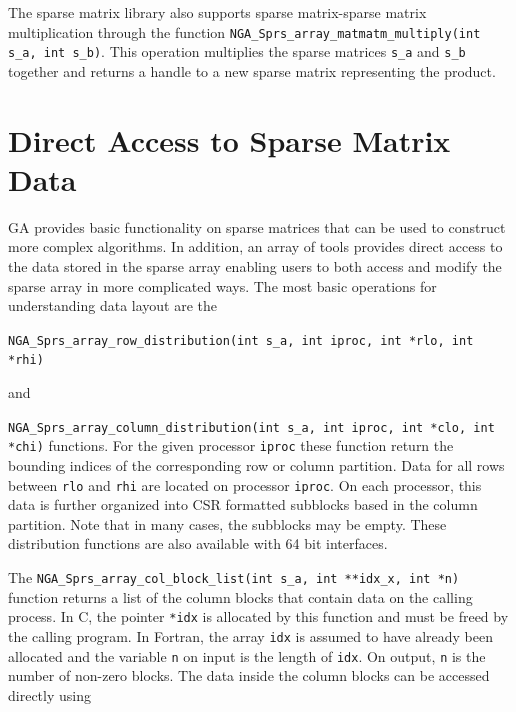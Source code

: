 The sparse matrix library also supports sparse matrix-sparse matrix
multiplication through the function \texttt{NGA\_Sprs\_array\_matmatm\_multiply(int
s\_a, int s\_b)}. This operation multiplies the sparse matrices \texttt{s\_a}
and \texttt{s\_b} together and returns a handle to a new sparse matrix
representing the product.

\section{Direct Access to Sparse Matrix Data}

GA provides basic functionality on sparse matrices that can be used to construct
more complex algorithms. In addition, an array of tools provides direct access
to the data stored in the sparse array enabling users to both access and modify
the sparse array in more complicated ways.\newline
The most basic operations for understanding data layout are the

\texttt{NGA\_Sprs\_array\_row\_distribution(int s\_a, int iproc, int *rlo, int
*rhi)}

and 

\texttt{NGA\_Sprs\_array\_column\_distribution(int s\_a, int iproc, int *clo, int
*chi)} 
\newline
functions. For the given processor \texttt{iproc} these function return
the bounding indices of the corresponding row or column partition. Data for all
rows between \texttt{rlo} and \texttt{rhi} are located on processor
\texttt{iproc}. On each processor, this data is further organized into CSR
formatted subblocks based in the column partition. Note that in many cases, the
subblocks may be empty. These distribution functions are also available with 64 bit
interfaces.


The \texttt{NGA\_Sprs\_array\_col\_block\_list(int s\_a, int **idx\_x, int *n)}
function returns a list of the column blocks that contain data on the calling
process. In C, the pointer \texttt{*idx} is allocated by this function and must
be freed by the calling program. In Fortran, the array \texttt{idx} is assumed
to have already been allocated and the variable \texttt{n} on input is the
length of \texttt{idx}. On output, \texttt{n} is the number of non-zero blocks.
\newline
The data inside the column blocks can be accessed directly using 

